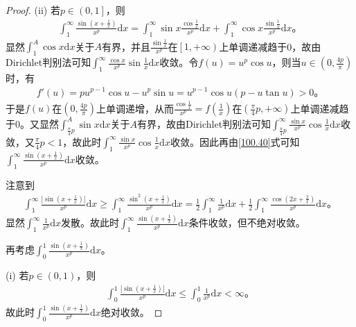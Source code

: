 \documentclass[../../main.tex]{subfiles}
\begin{document}
\begin{proof}
(ii) 若\(p\in \left( 0,1 \right]\)，则
\begin{align}
\int_1^{\infty}{\frac{\sin \left( x+\frac{1}{x} \right)}{x^p}\mathrm{d}x}=\int_1^{\infty}{\sin x\frac{\cos \frac{1}{x}}{x^p}\mathrm{d}x}+\int_1^{\infty}{\cos x\frac{\sin \frac{1}{x}}{x^p}\mathrm{d}x}。\label{100.40}
\end{align}
显然\(\int_1^A{\cos x\mathrm{d}x}\)关于\(A\)有界，并且\(\frac{\sin \frac{1}{x}}{x^p}\)在\(\left[ 1,+\infty \right)\)上单调递减趋于0，故由Dirichlet判别法可知\(\int_1^{\infty}{\frac{\cos x}{x^p}\sin \frac{1}{x}\mathrm{d}x}\)收敛。令\(f\left( u \right) =u^p\cos u\)，则当\(u\in \left( 0,\frac{4p}{\pi} \right)\)时，有
\begin{align*}
f'\left( u \right) =pu^{p-1}\cos u-u^p\sin u=u^{p-1}\cos u\left( p-u\tan u \right) >0。
\end{align*}
于是\(f\left( u \right)\)在\(\left( 0,\frac{4p}{\pi} \right)\)上单调递增，从而\(\frac{\cos \frac{1}{x}}{x^p}=f\left( \frac{1}{x} \right)\)在\(\left( \frac{\pi}{4}p,+\infty \right)\)上单调递减趋于0。又显然\(\int_{\frac{\pi}{4}p}^A{\sin x\mathrm{d}x}\)关于\(A\)有界，故由Dirichlet判别法可知\(\int_{\frac{\pi}{4}p}^{\infty}{\frac{\sin x}{x^p}\cos \frac{1}{x}\mathrm{d}x}\)收敛，又\(\frac{\pi}{4}p<1\)，故此时\(\int_1^{\infty}{\frac{\sin x}{x^p}\cos \frac{1}{x}\mathrm{d}x}\)收敛。因此再由\eqref{100.40}式可知\(\int_1^{\infty}{\frac{\sin \left( x+\frac{1}{x} \right)}{x^p}\mathrm{d}x}\)收敛。

注意到
\begin{align*}
\int_1^{\infty}{\frac{\left| \sin \left( x+\frac{1}{x} \right) \right|}{x^p}\mathrm{d}x}\geqslant \int_1^{\infty}{\frac{\sin ^2\left( x+\frac{1}{x} \right)}{x^p}\mathrm{d}x}
=\frac{1}{2}\int_1^{\infty}{\frac{1}{x^p}\mathrm{d}x}+\frac{1}{2}\int_1^{\infty}{\frac{\cos \left( 2x+\frac{2}{x} \right)}{x^p}\mathrm{d}x}。
\end{align*}
显然\(\int_1^{\infty}{\frac{1}{x^p}\mathrm{d}x}\)发散。故此时\(\int_1^{\infty}{\frac{\sin \left( x+\frac{1}{x} \right)}{x^p}\mathrm{d}x}\)条件收敛，但不绝对收敛。

再考虑\(\int_0^1{\frac{\sin \left( x+\frac{1}{x} \right)}{x^p}\mathrm{d}x}\)。

(i) 若\(p\in \left( 0,1 \right)\)，则
\begin{align*}
\int_0^1{\frac{\left| \sin \left( x+\frac{1}{x} \right) \right|}{x^p}\mathrm{d}x}\leqslant \int_0^1{\frac{1}{x^p}\mathrm{d}x}<\infty。
\end{align*}
故此时\(\int_0^1{\frac{\sin \left( x+\frac{1}{x} \right)}{x^p}\mathrm{d}x}\)绝对收敛。


\end{proof}
\end{document}
